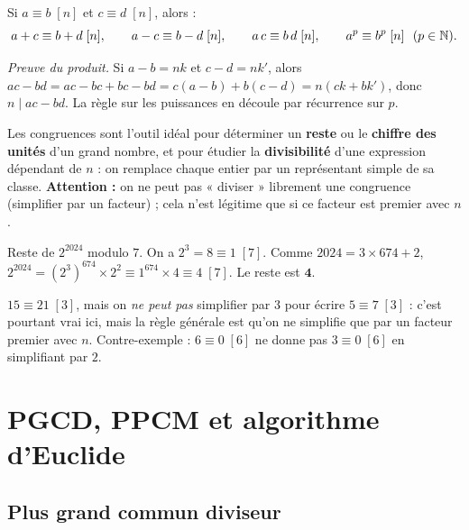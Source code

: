 \begin{theoreme}
Si $a\equiv b\;[n]$ et $c\equiv d\;[n]$, alors :
\[
a+c\equiv b+d\;[n],\qquad a-c\equiv b-d\;[n],\qquad a\,c\equiv b\,d\;[n],\qquad a^{p}\equiv b^{p}\;[n]\ \ (p\in\N).
\]
\end{theoreme}

\begin{remarque}
\emph{Preuve du produit.} Si $a-b=n k$ et $c-d=n k'$, alors $ac-bd=ac-bc+bc-bd=c(a-b)+b(c-d)=n(ck+bk')$, donc $n\mid ac-bd$. La règle sur les puissances en découle par récurrence sur $p$.
\end{remarque}

\begin{aretenir}
Les congruences sont l'outil idéal pour déterminer un \textbf{reste} ou le \textbf{chiffre des unités} d'un grand nombre, et pour étudier la \textbf{divisibilité} d'une expression dépendant de $n$ : on remplace chaque entier par un représentant simple de sa classe. \textbf{Attention :} on ne peut pas « diviser » librement une congruence (simplifier par un facteur) ; cela n'est légitime que si ce facteur est premier avec $n$.
\end{aretenir}

\begin{exemple}
Reste de $2^{2024}$ modulo $7$. On a $2^{3}=8\equiv 1\;[7]$. Comme $2024=3\times 674+2$,
$2^{2024}=(2^{3})^{674}\times 2^{2}\equiv 1^{674}\times 4\equiv 4\;[7]$. Le reste est $\mathbf{4}$.
\end{exemple}

\begin{exemple}
$15\equiv 21\;[3]$, mais on \emph{ne peut pas} simplifier par $3$ pour écrire $5\equiv 7\;[3]$ : c'est pourtant vrai ici, mais la règle générale est qu'on ne simplifie que par un facteur premier avec $n$. Contre-exemple : $6\equiv 0\;[6]$ ne donne pas $3\equiv 0\;[6]$ en simplifiant par $2$.
\end{exemple}

\section{PGCD, PPCM et algorithme d'Euclide}

\subsection{Plus grand commun diviseur}

